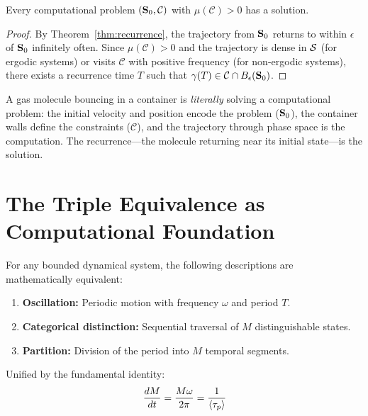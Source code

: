 \begin{theorem}
\label{thm:existence}
Every computational problem $(\mathbf{S}_0, \mathcal{C})$ with $\mu(\mathcal{C}) > 0$ has a solution.
\end{theorem}

\begin{proof}
By Theorem~\ref{thm:recurrence}, the trajectory from $\mathbf{S}_0$ returns to within $\epsilon$ of $\mathbf{S}_0$ infinitely often. Since $\mu(\mathcal{C}) > 0$ and the trajectory is dense in $\mathcal{S}$ (for ergodic systems) or visits $\mathcal{C}$ with positive frequency (for non-ergodic systems), there exists a recurrence time $T$ such that $\gamma(T) \in \mathcal{C} \cap B_\epsilon(\mathbf{S}_0)$.
\end{proof}

\begin{remark}
A gas molecule bouncing in a container is \emph{literally} solving a computational problem: the initial velocity and position encode the problem ($\mathbf{S}_0$), the container walls define the constraints ($\mathcal{C}$), and the trajectory through phase space is the computation. The recurrence---the molecule returning near its initial state---is the solution.
\end{remark}

\section{The Triple Equivalence as Computational Foundation}
\label{sec:triple_equiv}

\begin{theorem}
\label{thm:triple}
For any bounded dynamical system, the following descriptions are mathematically equivalent:
\begin{enumerate}
    \item \textbf{Oscillation:} Periodic motion with frequency $\omega$ and period $T$.
    \item \textbf{Categorical distinction:} Sequential traversal of $M$ distinguishable states.
    \item \textbf{Partition:} Division of the period into $M$ temporal segments.
\end{enumerate}
Unified by the fundamental identity:
\begin{equation}
\label{eq:fund_id}
    \frac{dM}{dt} = \frac{M\omega}{2\pi} = \frac{1}{\langle\tau_p\rangle}
\end{equation}
\end{theorem}

